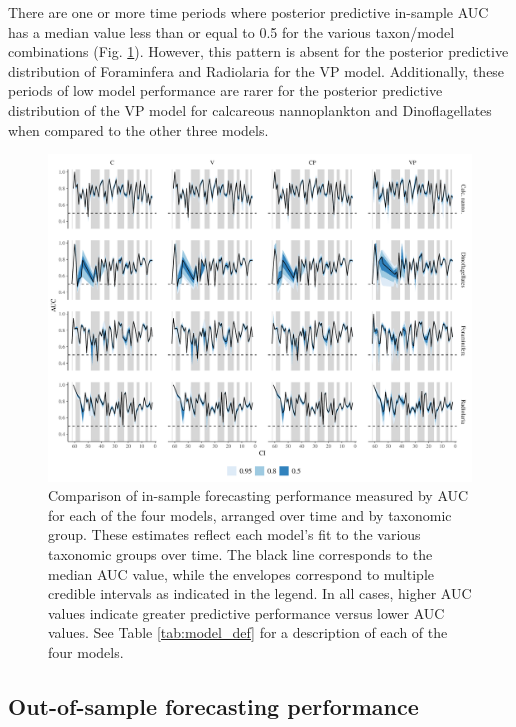 \documentclass[12pt,letterpaper]{article}
\begin{document}
\begin{refsection}
There are one or more time periods where posterior predictive in-sample AUC has a median value less than or equal to 0.5 for the various taxon/model combinations (Fig. \ref{fig:auc_taxon_time}). However, this pattern is absent for the posterior predictive distribution of Foraminfera and Radiolaria for the VP model. Additionally, these periods of low model performance are rarer for the posterior predictive distribution of the VP model for calcareous nannoplankton and Dinoflagellates when compared to the other three models.
\begin{figure}[ht]
  \centering
  \includegraphics[width=\textwidth,height=0.5\textheight,keepaspectratio=true]{../results/figure/auc_taxon_time_full}
  \caption{Comparison of in-sample forecasting performance measured by AUC for each of the four models, arranged over time and by taxonomic group. These estimates reflect each model's fit to the various taxonomic groups over time. The black line corresponds to the median AUC value, while the envelopes correspond to multiple credible intervals as indicated in the legend. In all cases, higher AUC values indicate greater predictive performance versus lower AUC values. See Table \ref{tab:model_def} for a description of each of the four models.}
  \label{fig:auc_taxon_time}
\end{figure}




\subsection{Out-of-sample forecasting performance}


\end{refsection}
\end{document}
